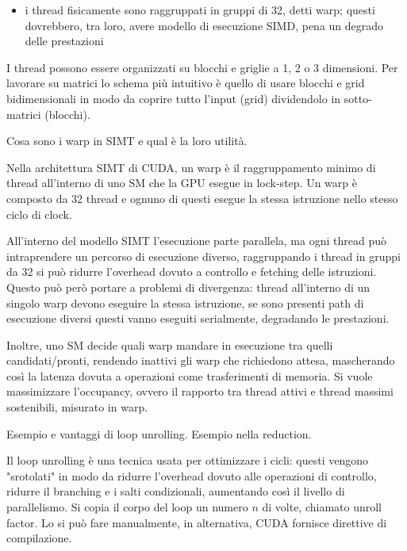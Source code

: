 \begin{questions}
\begin{solution}
\begin{itemize}
    		\item i thread fisicamente sono raggruppati in gruppi di 32, detti warp; questi dovrebbero, tra loro, avere modello di esecuzione SIMD, pena un degrado delle prestazioni 
    	\end{itemize}
        
        I thread possono essere organizzati su blocchi e griglie a 1, 2 o 3 dimensioni. Per lavorare su matrici lo schema più intuitivo è quello di usare blocchi e grid bidimensionali in modo da coprire tutto l'input (grid) dividendolo in sotto-matrici (blocchi).
    \end{solution}
    
    \question Cosa sono i warp in SIMT e qual è la loro utilità.
    
    \begin{solution}
    	Nella architettura SIMT di CUDA, un warp è il raggruppamento minimo di thread all'interno di uno SM che la GPU esegue in lock-step. Un warp è composto da 32 thread e ognuno di questi esegue la stessa istruzione nello stesso ciclo di clock. 
    	
    	All'interno del modello SIMT l'esecuzione parte parallela, ma ogni thread può intraprendere un percorso di esecuzione diverso, raggruppando i thread in gruppi da 32 si può ridurre l'overhead dovuto a controllo e fetching delle istruzioni. Questo può però portare a problemi di divergenza: thread all'interno di un singolo warp devono eseguire la stessa istruzione, se sono presenti path di esecuzione diversi questi vanno eseguiti serialmente, degradando le prestazioni.
    	
    	Inoltre, uno SM decide quali warp mandare in esecuzione tra quelli candidati/pronti, rendendo inattivi gli warp che richiedono attesa, mascherando così la latenza dovuta a operazioni come trasferimenti di memoria. Si vuole massimizzare l'occupancy, ovvero il rapporto tra thread attivi e thread massimi sostenibili, misurato in warp. 
    \end{solution}
    
    \question Esempio e vantaggi di loop unrolling. Esempio nella reduction.
    
    \begin{solution}
    	Il loop unrolling è una tecnica usata per ottimizzare i cicli: questi vengono "srotolati" in modo da ridurre l'overhead dovuto alle operazioni di controllo, ridurre il branching e i salti condizionali, aumentando così il livello di parallelismo. Si copia il corpo del loop un numero $n$ di volte, chiamato unroll factor. Lo si può fare manualmente, in alternativa, CUDA fornisce direttive di compilazione.
    	

\end{solution}
\end{questions}
